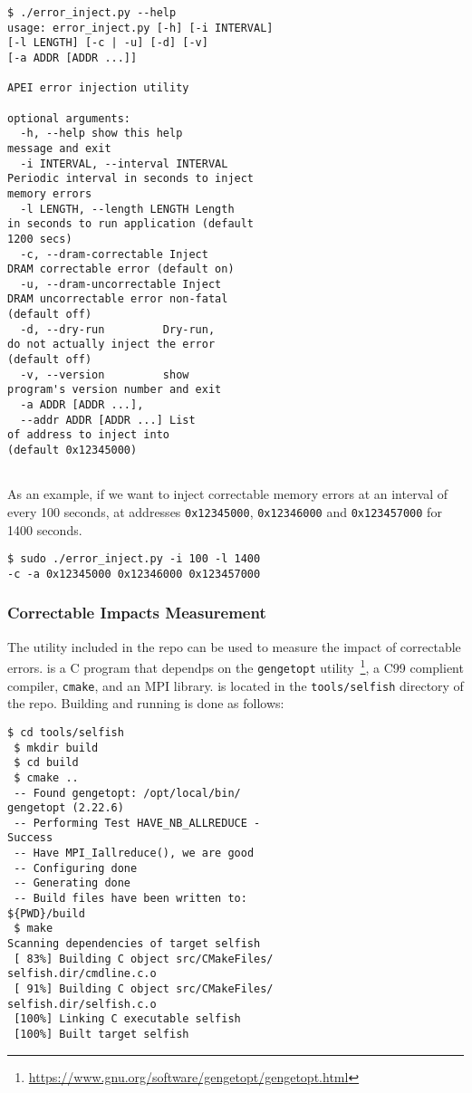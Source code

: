 \begin{Verbatim}[commandchars=\\\{\},frame=single]
 $ ./error_inject.py --help
usage: error_inject.py [-h] [-i INTERVAL]
[-l LENGTH] [-c | -u] [-d] [-v]
[-a ADDR [ADDR ...]]

APEI error injection utility

optional arguments:
  -h, --help show this help
message and exit
  -i INTERVAL, --interval INTERVAL
Periodic interval in seconds to inject
memory errors
  -l LENGTH, --length LENGTH Length
in seconds to run application (default
1200 secs)
  -c, --dram-correctable Inject
DRAM correctable error (default on)
  -u, --dram-uncorrectable Inject
DRAM uncorrectable error non-fatal
(default off)
  -d, --dry-run         Dry-run,
do not actually inject the error
(default off)
  -v, --version         show
program's version number and exit
  -a ADDR [ADDR ...],
  --addr ADDR [ADDR ...] List
of address to inject into
(default 0x12345000)
 
\end{Verbatim}

As an example, if we want to inject correctable memory errors at an interval of
every 100 seconds, at addresses {\texttt{0x12345000}}, {\texttt{0x12346000}} and
{\texttt{0x123457000}} for 1400 seconds.

\begin{Verbatim}[commandchars=\\\{\},frame=single]
 $ sudo ./error_inject.py -i 100 -l 1400
-c -a 0x12345000 0x12346000 0x123457000
\end{Verbatim}

\subsubsection{Correctable Impacts Measurement}

The \selfish utility included in the repo can be used to measure the impact of
correctable errors.  \selfish is a C program that dependps on the
{\texttt{gengetopt}}
utility~\footnote{\url{https://www.gnu.org/software/gengetopt/gengetopt.html}},
a C99 complient compiler, {\texttt{cmake}}, and an MPI library. \selfish is
located in the {\texttt{tools/selfish}} directory of the repo.  Building and
running is done as follows:


\begin{Verbatim}[commandchars=\\\{\},frame=single]
 $ cd tools/selfish
 $ mkdir build
 $ cd build
 $ cmake ..
 -- Found gengetopt: /opt/local/bin/
gengetopt (2.22.6)
 -- Performing Test HAVE_NB_ALLREDUCE -
Success
 -- Have MPI_Iallreduce(), we are good
 -- Configuring done
 -- Generating done
 -- Build files have been written to:
${PWD}/build
 $ make 
Scanning dependencies of target selfish
 [ 83%] Building C object src/CMakeFiles/
selfish.dir/cmdline.c.o
 [ 91%] Building C object src/CMakeFiles/
selfish.dir/selfish.c.o
 [100%] Linking C executable selfish
 [100%] Built target selfish

\end{Verbatim}

